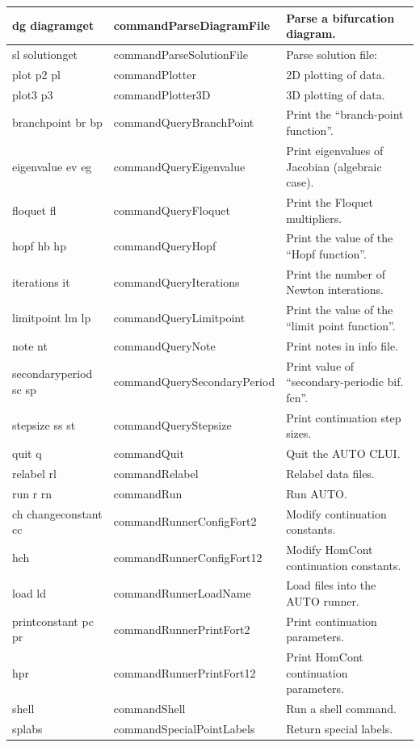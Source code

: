 \documentclass[12pt]{report}
\begin{document}
\begin{longtable}{|p{1.1in}|l|p{2.5in}|}
dg diagramget & commandParseDiagramFile & Parse a bifurcation diagram.\\ \hline 
sl solutionget & commandParseSolutionFile & Parse solution file:\\ \hline 
plot p2 pl & commandPlotter & 2D plotting of data.\\ \hline 
plot3 p3 & commandPlotter3D & 3D plotting of data.\\ \hline 
branchpoint br bp & commandQueryBranchPoint & Print the ``branch-point function''.\\ \hline 
eigenvalue ev eg & commandQueryEigenvalue & Print eigenvalues of Jacobian (algebraic case).\\ \hline 
floquet fl & commandQueryFloquet & Print the Floquet multipliers.\\ \hline 
hopf hb hp & commandQueryHopf & Print the value of the ``Hopf function''.\\ \hline 
iterations it & commandQueryIterations & Print the number of Newton interations.\\ \hline 
limitpoint lm lp & commandQueryLimitpoint & Print the value of the ``limit point function''.\\ \hline 
note nt & commandQueryNote & Print notes in info file.\\ \hline 
secondaryperiod sc sp & commandQuerySecondaryPeriod & Print value of ``secondary-periodic bif. fcn''.\\ \hline 
stepsize ss st & commandQueryStepsize & Print continuation step sizes.\\ \hline 
quit q & commandQuit & Quit the AUTO CLUI.\\ \hline 
relabel rl & commandRelabel & Relabel data files.\\ \hline
run r rn & commandRun & Run AUTO.\\ \hline 
ch changeconstant cc & commandRunnerConfigFort2 & Modify continuation constants.\\ \hline 
hch & commandRunnerConfigFort12 & Modify HomCont continuation constants.\\ \hline 
load ld & commandRunnerLoadName & Load files into the AUTO runner.\\ \hline 
printconstant pc pr & commandRunnerPrintFort2 & Print continuation parameters.\\ \hline 
hpr & commandRunnerPrintFort12 & Print HomCont continuation parameters.\\ \hline 
shell & commandShell & Run a shell command.\\ \hline 
splabs & commandSpecialPointLabels & Return special labels.\\ \hline

\end{longtable}
\end{document}
